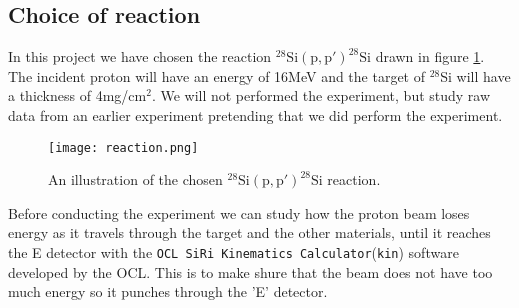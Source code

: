 \documentclass[11pt,a4wide]{article}
\begin{document}

\subsection{Choice of reaction}%
In this project we have chosen the reaction ${}^{28}\mathrm{Si(p,p')}^{28}\mathrm{Si}$ drawn in figure \ref{fig: reaction}. The incident proton will have an energy of 16MeV and the target of ${}^28$Si will have a thickness of 4mg/cm${}^2$. We will not performed the experiment, but study raw data from an earlier experiment pretending that we did perform the experiment.  %

\begin{figure}[htp]
\centering
\texttt{[image: reaction.png]}
\caption{An illustration of the chosen ${}^{28}\mathrm{Si(p,p')}^{28}\mathrm{Si}$ reaction.}
\label{fig: reaction}
\end{figure}

Before conducting the experiment we can study how the proton beam loses energy as it travels through the target and the other materials, until it reaches the E detector with the \texttt{OCL SiRi Kinematics Calculator}(\texttt{kin}) software developed by the OCL. This is to make shure that the beam does not have too much energy so it punches through the 'E' detector. 


\end{document}
